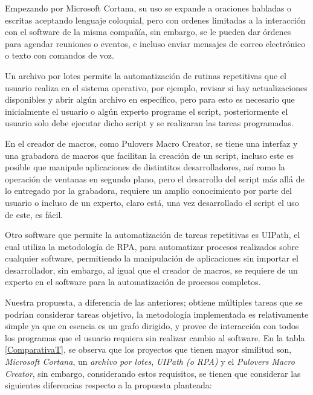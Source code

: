 Empezando por Microsoft Cortana, su uso se expande a oraciones habladas o 
 escritas aceptando lenguaje coloquial, pero con ordenes limitadas a la 
 interacci\'on con el software de la misma compa\~n\'ia, sin embargo, se le 
 pueden dar \'ordenes para agendar reuniones o eventos, e incluso enviar 
 mensajes de correo electr\'onico o texto con comandos de voz. 


Un archivo por lotes permite la automatizaci\'on de rutinas repetitivas que
 el usuario realiza en el sistema operativo, por ejemplo, revisar si hay 
 actualizaciones disponibles y abrir alg\'un archivo en espec\'ifico, pero 
 para esto es necesario que inicialmente el usuario o alg\'un experto 
 programe el script, posteriormente el usuario solo debe ejecutar dicho 
 script y se realizaran las tareas programadas.


En el creador de macros, como Pulover\textsc{}s Macro Creator, se 
 tiene una interfaz y una grabadora de macros que facilitan la creaci\'on de 
 un script, incluso este es posible que manipule aplicaciones de distintitos 
 desarrolladores, as\'i como la operaci\'on de ventanas en segundo plano, 
 pero el desarrollo del script m\'as all\'a de lo entregado por la grabadora, 
 requiere un amplio conocimiento por parte del usuario o incluso de un 
 experto, claro est\'a, una vez desarrollado el script el uso de este, es 
 f\'acil.


Otro software que permite la automatizaci\'on de tareas repetitivas es 
 UIPath, el cual utiliza la metodolog\'ia de RPA, para automatizar procesos 
 realizados sobre cualquier software, permitiendo la manipulaci\'on de 
 aplicaciones sin importar el desarrollador, sin embargo, al igual que el 
 creador de macros, se requiere de un experto en el software para la 
 automatizaci\'on de procesos completos. 


Nuestra propuesta, a diferencia de las anteriores; obtiene m\'ultiples tareas
 que se podr\'ian considerar tareas objetivo, la metodolog\'ia implementada 
 es relativamente simple ya que en esencia es un grafo dirigido, y provee de 
 interacci\'on con todos los programas que el usuario requiera sin realizar 
 cambio al software. En la tabla \ref{ComparativaT}, se observa que los 
 proyectos que tienen mayor 
 similitud son, \emph{Microsoft Cortana}, un \emph{archivo por lotes}, 
 \emph{UIPath (o RPA)} y el \emph{Pulover\textsc{}s Macro Creator},
 sin embargo, considerando estos requisitos, se tienen que considerar las 
 siguientes diferencias respecto a la propuesta planteada:

